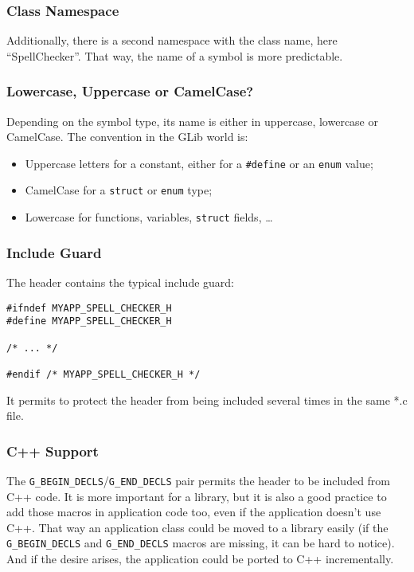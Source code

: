 \subsubsection{Class Namespace}
Additionally, there is a second namespace with the class name, here ``SpellChecker''. That way, the name of a symbol is more predictable.

\subsubsection{Lowercase, Uppercase or CamelCase?}
Depending on the symbol type, its name is either in uppercase, lowercase or CamelCase. The convention in the GLib world is:
\begin{itemize}
  \item Uppercase letters for a constant, either for a \lstinline{#define} or an \lstinline{enum} value;
  \item CamelCase for a \lstinline{struct} or \lstinline{enum} type;
  \item Lowercase for functions, variables, \lstinline{struct} fields, …
\end{itemize}

\subsubsection{Include Guard}
The header contains the typical include guard:

\begin{lstlisting}
#ifndef MYAPP_SPELL_CHECKER_H
#define MYAPP_SPELL_CHECKER_H

/* ... */

#endif /* MYAPP_SPELL_CHECKER_H */
\end{lstlisting}

It permits to protect the header from being included several times in the same *.c file.

\subsubsection{C++ Support}
The \lstinline{G_BEGIN_DECLS}/\lstinline{G_END_DECLS} pair permits the header to be included from C++ code. It is more important for a library, but it is also a good practice to add those macros in application code too, even if the application doesn't use C++. That way an application class could be moved to a library easily (if the \lstinline{G_BEGIN_DECLS} and \lstinline{G_END_DECLS} macros are missing, it can be hard to notice). And if the desire arises, the application could be ported to C++ incrementally.

